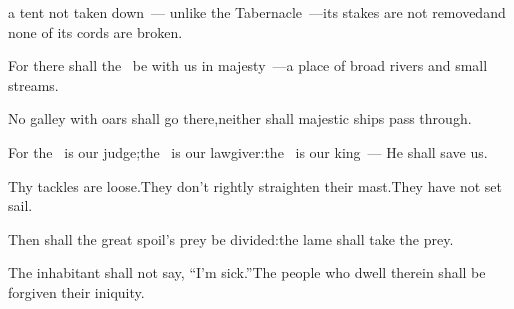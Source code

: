 \begin{inparaenum}
  \pa{}a tent not taken down~--- unlike the Tabernacle~---\pa{}its stakes are not removed\pa{}and none of its cords are broken.%

  \pa{} For there shall the \lord\ be with us in majesty~---\pa{}a place of broad rivers and small streams.%

  \pa{}No galley with oars shall go there,\pa{}neither shall majestic ships pass through.%

  \pa{} For the \lord\ is our judge;\pa{}the \lord\ is our lawgiver:\pa{}the \lord\ is our king~--- He shall save us.%

  \pa{} Thy tackles are loose.\pa{}They don't rightly straighten their mast.\pa{}They have not set sail.%

  \pa{}Then shall the great spoil's prey be divided:\pa{}the lame shall take the prey.%

  \pa{} The inhabitant shall not say, ``I'm sick.''\pa{}The people who dwell therein shall be forgiven their iniquity.%
\end{inparaenum}
